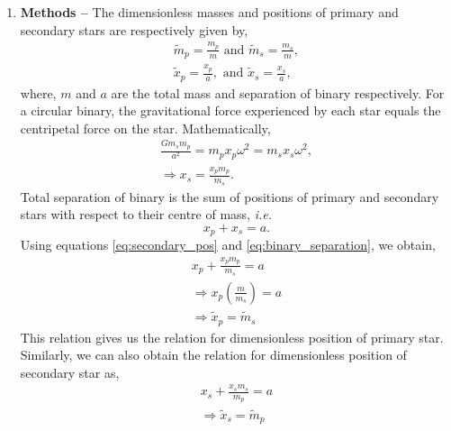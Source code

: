 \documentclass[a4paper]{article}
\begin{document}
		\begin{enumerate} [label*=\textbf{(\alph*)}]
			
			
			\item
				\subitem \textbf{Methods  --}
				The dimensionless masses and positions of primary and secondary stars are respectively given by,
				\begin{equation}
					\begin{gathered}
						\tilde{m}_p^{}=\frac{m_p^{}}{m} \text{ and } \tilde{m}_s^{}=\frac{m_s^{}}{m}, \\
						\tilde{x}_p^{}=\frac{x_p^{}}{a}, \text{ and } \tilde{x}_s^{}=\frac{x_s^{}}{a},
					\end{gathered}
					\label{eq:dimensionless_mass_pos}
				\end{equation}
				where, \(m\) and \(a\) are the total mass and separation of binary respectively. For a circular binary, the gravitational force experienced by each star equals the centripetal force on the star. Mathematically,
				\begin{equation}
					\begin{gathered}
						\frac{Gm_{s}^{}m_{p}^{}}{a^2_{}} = m_p^{} x_p^{} \omega^2_{} = m_s^{} x_s^{} \omega^2_{} , \\
						\Rightarrow x_s^{} = \frac{x_p^{} m_p^{}}{m_s^{}}.
					\end{gathered}
					\label{eq:secondary_pos}
				\end{equation}
				Total separation of binary is the sum of positions of primary and secondary stars with respect to their centre of mass, \textit{i.e.} 
				\begin{equation}
					x_p^{}+x_s^{} = a.
					\label{eq:binary_separation}
				\end{equation}
				Using equations \ref{eq:secondary_pos} and \ref{eq:binary_separation}, we obtain,
				\begin{equation}
					\begin{gathered}
						x_p + \frac{x_p m_p}{m_s} = a \\
						\Rightarrow x_p \left( \frac{m}{m_s}\right) = a \\
						\Rightarrow \tilde{x}_p = \tilde{m}_s 
					\end{gathered}
					\label{eq:xp_tilde}
				\end{equation}
				This relation gives us the relation for dimensionless position of primary star. Similarly, we can also obtain the relation for dimensionless position of secondary star as,
				\begin{equation}
					\begin{gathered}
						x_s + \frac{x_s m_s}{m_p} = a \\
						\Rightarrow \tilde{x}_s = \tilde{m}_p
					\end{gathered}
					\label{eq:xs_tilde}
				\end{equation}
				

\end{enumerate}
\end{document}
